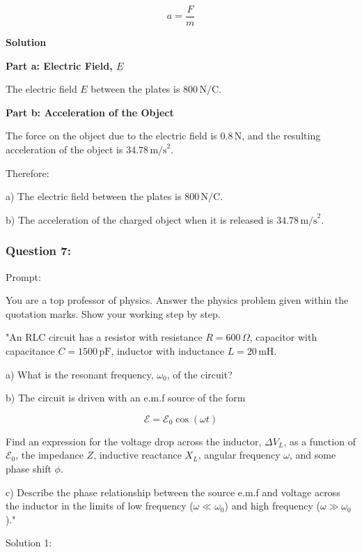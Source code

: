 \documentclass[a4paper,11pt]{article}
\begin{document}
\[
a = \frac{F}{m}
\]

\textbf{Solution}

\textbf{Part a: Electric Field, \( \underline{E} \)}

The electric field \( E \) between the plates is \( 800 \, \text{N/C} \).

\textbf{Part b: Acceleration of the Object}

The force on the object due to the electric field is \( 0.8 \, \text{N} \), and the resulting acceleration of the object is \( 34.78 \, \text{m/s}^2 \).

Therefore:

a) The electric field between the plates is \( 800 \, \text{N/C} \).

b) The acceleration of the charged object when it is released is \( 34.78 \, \text{m/s}^2 \).

\subsubsection*{Question 7:}

Prompt: 
\begin{spverbatim}
    You are a top professor of physics. Answer the physics problem given within the quotation marks. Show your working step by step.

    "An RLC circuit has a resistor with resistance \( R = 600 \, \Omega \), capacitor with capacitance \( C = 1500 \, \text{pF} \), inductor with inductance \( L = 20 \, \text{mH} \).

    a) What is the resonant frequency, \( \omega_{0} \), of the circuit?

    b) The circuit is driven with an e.m.f source of the form 

    \[ \mathcal{E} = \mathcal{E}_{0} \cos(\omega t) \]

    Find an expression for the voltage drop across the inductor, \( \Delta V_{L} \), as a function of \( \mathcal{E}_{0} \), the impedance \( Z \), inductive reactance \( X_{L} \), angular frequency \( \omega \), and some phase shift \( \phi \).

    c) Describe the phase relationship between the source e.m.f and voltage across the inductor in the limits of low frequency (\( \omega \ll \omega_{0} \)) and high frequency (\( \omega \gg \omega_{0} \))."
\end{spverbatim}

\bigskip

\noindent Solution 1: \\
\end{document}
